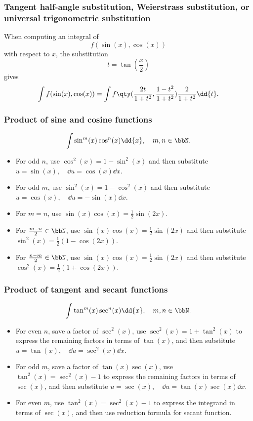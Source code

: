 \subsubsection{Tangent half-angle substitution, Weierstrass substitution, or universal trigonometric substitution}
When computing an integral of
\[f(\sin(x),\cos(x))\]
with respect to $x$, the substitution
\[t=\tan(\frac{x}{2})\]
gives
\[\int f(\sin(x),\cos(x))=\int f\qty(\frac{2t}{1+t^2},\frac{1-t^2}{1+t^2})\frac{2}{1+t^2}\dd{t}.\]
\subsubsection{Product of sine and cosine functions}
\[\int\sin^m(x)\cos^n(x)\dd{x},\quad m,n\in\bbN.\]
\begin{itemize}
\item For odd $n$, use $\cos^2(x)=1-\sin^2(x)$ and then substitute $u=\sin(x),\quad\dd{u}=\cos(x)\dd{x}$.
\item For odd $m$, use $\sin^2(x)=1-\cos^2(x)$ and then substitute $u=\cos(x),\quad\dd{u}=-\sin(x)\dd{x}$.
\item For $m=n$, use $\sin(x)\cos(x)=\frac{1}{2}\sin(2x)$.
\item For $\frac{m-n}{2}\in\bbN$, use $\sin(x)\cos(x)=\frac{1}{2}\sin(2x)$ and then substitute $\sin^2(x)=\frac{1}{2}(1-\cos(2x))$.
\item For $\frac{n-m}{2}\in\bbN$, use $\sin(x)\cos(x)=\frac{1}{2}\sin(2x)$ and then substitute $\cos^2(x)=\frac{1}{2}(1+\cos(2x))$.
\end{itemize}
\subsubsection{Product of tangent and secant functions}
\[\int\tan^m(x)\sec^n(x)\dd{x},\quad m,n\in\bbN.\]
\begin{itemize}
\item For even $n$, save a factor of $\sec^2(x)$, use $\sec^2(x)=1+\tan^2(x)$ to express the remaining factors in terms of $\tan(x)$, and then substitute $u=\tan(x),\quad\dd{u}=\sec^2(x)\dd{x}$.
\item For odd $m$, save a factor of $\tan(x)\sec(x)$, use $\tan^2(x)=\sec^2(x)-1$ to express the remaining factors in terms of $\sec(x)$, and then substitute $u=\sec(x),\quad\dd{u}=\tan(x)\sec(x)\dd{x}$.
\item For even $m$, use $\tan^2(x)=\sec^2(x)-1$ to express the integrand in terms of $\sec(x)$, and then use reduction formula for secant function.
\end{itemize}
